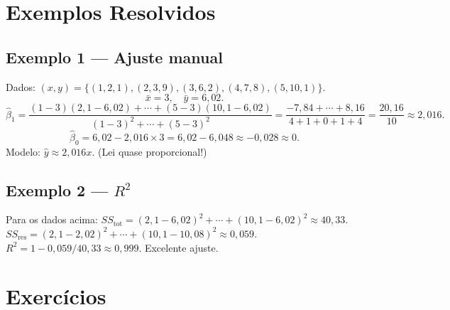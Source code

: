 \documentclass[12pt,a4paper]{article}
\begin{document}
\section*{Exemplos Resolvidos}

\subsection*{Exemplo 1 --- Ajuste manual}
Dados: $(x,y) = \{(1,2{,}1),(2,3{,}9),(3,6{,}2),(4,7{,}8),(5,10{,}1)\}$.
\[
\bar x = 3,\quad \bar y = 6{,}02.
\]
\[
\hat\beta_1 = \frac{(1-3)(2{,}1-6{,}02)+\cdots+(5-3)(10{,}1-6{,}02)}{(1-3)^2+\cdots+(5-3)^2} = \frac{-7{,}84+\cdots+8{,}16}{4+1+0+1+4} = \frac{20{,}16}{10} \approx 2{,}016.
\]
\[
\hat\beta_0 = 6{,}02 - 2{,}016 \times 3 = 6{,}02 - 6{,}048 \approx -0{,}028 \approx 0.
\]
Modelo: $\hat y \approx 2{,}016 x$. (Lei quase proporcional!)

\subsection*{Exemplo 2 --- $R^2$}
Para os dados acima:
$SS_\text{tot} = (2{,}1-6{,}02)^2 + \cdots + (10{,}1-6{,}02)^2 \approx 40{,}33$.
$SS_\text{res} = (2{,}1-2{,}02)^2 + \cdots + (10{,}1-10{,}08)^2 \approx 0{,}059$.
$R^2 = 1 - 0{,}059/40{,}33 \approx 0{,}999$. Excelente ajuste.

\section*{Exerc\'icios}
\end{document}
